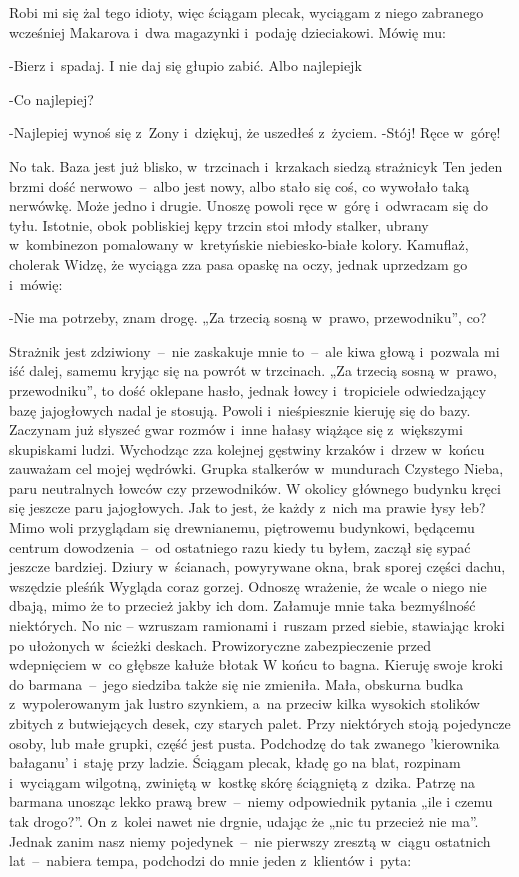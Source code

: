 \documentclass[../MAIN.tex]{subfiles}
\begin{document}
Robi mi się żal tego idioty, więc ściągam plecak, wyciągam z
niego zabranego wcześniej Makarova i~dwa magazynki i~podaję
dzieciakowi. Mówię mu:

-Bierz i~spadaj. I nie daj się głupio zabić. Albo najlepiej\3k

-Co najlepiej?

-Najlepiej wynoś się z~Zony i~dziękuj, że uszedłeś z~życiem.
%
%
-Stój! Ręce w~górę!

No tak. Baza jest już blisko, w~trzcinach i~krzakach siedzą
strażnicy\3k Ten jeden brzmi dość nerwowo~--~albo jest nowy,
albo stało się coś, co wywołało taką nerwówkę. Może jedno i
drugie. Unoszę powoli ręce w~górę i~odwracam się do tyłu.
Istotnie, obok pobliskiej kępy trzcin stoi młody stalker,
ubrany w~kombinezon pomalowany w~kretyńskie niebiesko-białe
kolory. Kamuflaż, cholera\3k Widzę, że wyciąga zza pasa opaskę
na oczy, jednak uprzedzam go i~mówię:

-Nie ma potrzeby, znam drogę. „Za trzecią sosną w~prawo,
przewodniku”, co?

Strażnik jest zdziwiony~--~nie zaskakuje mnie to~--~ale kiwa
głową i~pozwala mi iść dalej, samemu kryjąc się na powrót w
trzcinach. „Za trzecią sosną w~prawo, przewodniku”, to dość
oklepane hasło, jednak łowcy i~tropiciele odwiedzający bazę
jajogłowych nadal je stosują. Powoli i~nieśpiesznie kieruję się
do bazy. Zaczynam już słyszeć gwar rozmów i~inne hałasy wiążące
się z~większymi skupiskami ludzi. Wychodząc zza kolejnej
gęstwiny krzaków i~drzew w~końcu zauważam cel mojej wędrówki.
Grupka stalkerów w~mundurach Czystego Nieba, paru neutralnych
łowców czy przewodników. W okolicy głównego budynku kręci się
jeszcze paru jajogłowych. Jak to jest, że każdy z~nich ma
prawie łysy łeb? Mimo woli przyglądam się drewnianemu,
piętrowemu budynkowi, będącemu centrum dowodzenia~--~od
ostatniego razu kiedy tu byłem, zaczął się sypać jeszcze
bardziej. Dziury w~ścianach, powyrywane okna, brak sporej
części dachu, wszędzie pleśń\3k Wygląda coraz gorzej. Odnoszę
wrażenie, że wcale o niego nie dbają, mimo że to przecież jakby
ich dom. Załamuje mnie taka bezmyślność niektórych. No nic –
wzruszam ramionami i~ruszam przed siebie, stawiając kroki po
ułożonych w~ścieżki deskach. Prowizoryczne zabezpieczenie przed
wdepnięciem w~co głębsze kałuże błota\3k W końcu to bagna.
Kieruję swoje kroki do barmana~--~jego siedziba także się nie
zmieniła. Mała, obskurna budka z~wypolerowanym jak lustro
szynkiem, a~na przeciw kilka wysokich stolików zbitych z
butwiejących desek, czy starych palet. Przy niektórych stoją
pojedyncze osoby, lub małe grupki, część jest pusta. Podchodzę
do tak zwanego 'kierownika bałaganu' i~staję przy ladzie.
Ściągam plecak, kładę go na blat, rozpinam i~wyciągam wilgotną,
zwiniętą w~kostkę skórę ściągniętą z~dzika. Patrzę na barmana
unosząc lekko prawą brew~--~niemy odpowiednik pytania „ile i
czemu tak drogo?”. On z~kolei nawet nie drgnie, udając że „nic
tu przecież nie ma”. Jednak zanim nasz niemy pojedynek~--~nie
pierwszy zresztą w~ciągu ostatnich lat~--~nabiera tempa,
podchodzi do mnie jeden z~klientów i~pyta:
\end{document}
